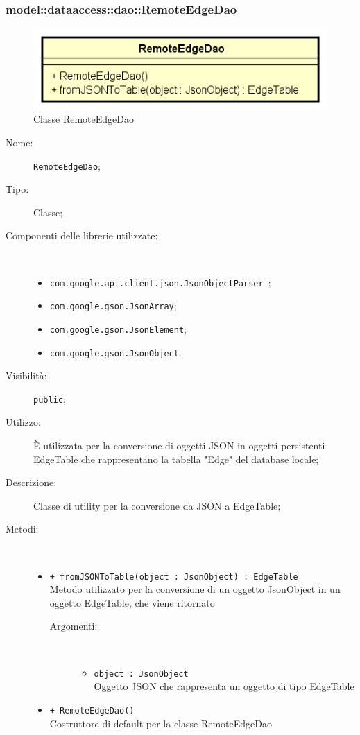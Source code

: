 \documentclass[../DefinizioneDiProdotto.tex]{subfiles}
\begin{document}
\subsubsection{model::dataaccess::dao::RemoteEdgeDao}

    \begin{figure}[H]
        \centering
        \includegraphics{img/RemoteEdgeDao.png}
        \caption{Classe RemoteEdgeDao}\label{fig:model::dataaccess::dao::RemoteEdgeDao} 
    \end{figure}
    \begin{description}
\item[Nome:] \texttt{RemoteEdgeDao};
\item[Tipo:] Classe;
\item[Componenti delle librerie utilizzate:] \
\begin{itemize}
\item \texttt{com.google.api.client.json.JsonObjectParser
};

\item \texttt{com.google.gson.JsonArray};

\item \texttt{com.google.gson.JsonElement};

\item \texttt{com.google.gson.JsonObject}.

\end{itemize}
\item[Visibilità:] \texttt{public};
\item[Utilizzo:] È utilizzata per la conversione di oggetti JSON in oggetti persistenti EdgeTable che rappresentano la tabella "Edge" del database locale;
\item[Descrizione:] Classe di utility per la conversione da JSON a EdgeTable;
\item[Metodi:] \
\begin{itemize}
\item \texttt{+ fromJSONToTable(object : JsonObject) : EdgeTable}\\
Metodo utilizzato per la conversione di un oggetto JsonObject in un oggetto EdgeTable, che viene ritornato
 \begin{description}
\item[Argomenti:] \
\begin{itemize}
\item \texttt{object : JsonObject}\\
Oggetto JSON che rappresenta un oggetto di tipo EdgeTable\end{itemize}
\end{description}
\item \texttt{+ RemoteEdgeDao()}\\
Costruttore di default per la classe RemoteEdgeDao
 \end{itemize}
\end{description}
\end{document}
